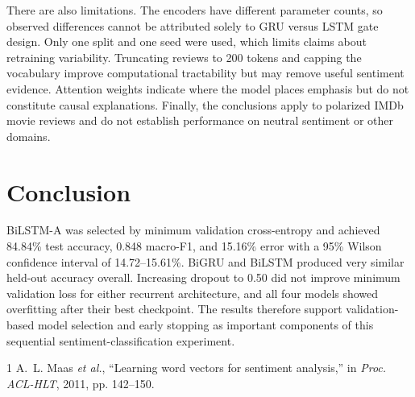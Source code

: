\documentclass[conference]{IEEEtran}
\begin{document}
There are also limitations. The encoders have different parameter counts, so observed differences cannot be attributed solely to GRU versus LSTM gate design. Only one split and one seed were used, which limits claims about retraining variability. Truncating reviews to 200 tokens and capping the vocabulary improve computational tractability but may remove useful sentiment evidence. Attention weights indicate where the model places emphasis but do not constitute causal explanations. Finally, the conclusions apply to polarized IMDb movie reviews and do not establish performance on neutral sentiment or other domains.

\section{Conclusion}
BiLSTM-A was selected by minimum validation cross-entropy and achieved 84.84\% test accuracy, 0.848 macro-F1, and 15.16\% error with a 95\% Wilson confidence interval of 14.72--15.61\%. BiGRU and BiLSTM produced very similar held-out accuracy overall. Increasing dropout to 0.50 did not improve minimum validation loss for either recurrent architecture, and all four models showed overfitting after their best checkpoint. The results therefore support validation-based model selection and early stopping as important components of this sequential sentiment-classification experiment.

\begin{thebibliography}{1}
A.~L. Maas \emph{et al.}, ``Learning word vectors for sentiment analysis,'' in \emph{Proc. ACL-HLT}, 2011, pp. 142--150.
\end{thebibliography}
\end{document}
